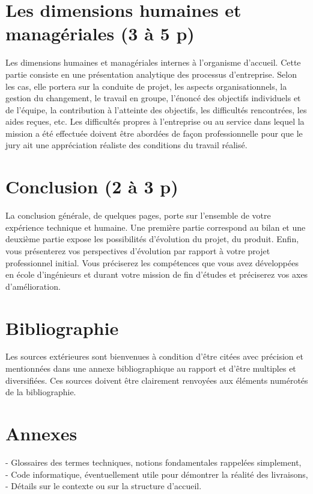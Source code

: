 \documentclass[11pt]{article}
\begin{document}
  \pagebreak
  \section{Les dimensions humaines et managériales (3 à 5 p)}
  Les dimensions humaines et managériales internes à l’organisme d’accueil. Cette partie consiste en
  une présentation analytique des processus d’entreprise. Selon les cas, elle portera sur la conduite de
  projet, les aspects organisationnels, la gestion du changement, le travail en groupe, l’énoncé des
  objectifs individuels et de l’équipe, la contribution à l’atteinte des objectifs, les difficultés rencontrées,
  les aides reçues, etc. Les difficultés propres à l’entreprise ou au service dans lequel la mission a été
  effectuée doivent être abordées de façon professionnelle pour que le jury ait une appréciation réaliste
  des conditions du travail réalisé.  

  \pagebreak
  \section{Conclusion (2 à 3 p)}
  La conclusion générale, de quelques pages, porte sur l’ensemble de votre expérience technique et
  humaine. Une première partie correspond au bilan et une deuxième partie expose les possibilités
  d’évolution du projet, du produit. Enfin, vous présenterez vos perspectives d’évolution par rapport à
  votre projet professionnel initial. Vous préciserez les compétences que vous avez développées en
  école d’ingénieurs et durant votre mission de fin d’études et préciserez vos axes d’amélioration.

  \pagebreak
  \section{Bibliographie}
  Les sources extérieures sont bienvenues à condition d’être citées avec précision et mentionnées dans
  une annexe bibliographique au rapport et d’être multiples et diversifiées.
  Ces sources doivent être clairement renvoyées aux éléments numérotés de la bibliographie.

  \pagebreak
  \section{Annexes}
  - Glossaires des termes techniques, notions fondamentales rappelées simplement, \\
  - Code informatique, éventuellement utile pour démontrer la réalité des livraisons, \\
  - Détails sur le contexte ou sur la structure d’accueil. 
\end{document}
